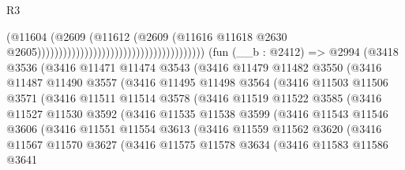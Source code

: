 \begin{lexlean}{R3}
\begin{coremodule}
                                                                        (@11604
                                                                          (@2609
                                                                            (@11612
                                                                              (@2609
                                                                                (@11616
                                                                                  @11618
                                                                                  @2630
                                                                                  @2605)))))))))))))))))))))))))))))))))))))))
    (fun (__b : @2412) =>
    @2994
      (@3418
        @3536
        (@3416
          @11471
          @11474
          @3543
          (@3416
            @11479
            @11482
            @3550
            (@3416
              @11487
              @11490
              @3557
              (@3416
                @11495
                @11498
                @3564
                (@3416
                  @11503
                  @11506
                  @3571
                  (@3416
                    @11511
                    @11514
                    @3578
                    (@3416
                      @11519
                      @11522
                      @3585
                      (@3416
                        @11527
                        @11530
                        @3592
                        (@3416
                          @11535
                          @11538
                          @3599
                          (@3416
                            @11543
                            @11546
                            @3606
                            (@3416
                              @11551
                              @11554
                              @3613
                              (@3416
                                @11559
                                @11562
                                @3620
                                (@3416
                                  @11567
                                  @11570
                                  @3627
                                  (@3416
                                    @11575
                                    @11578
                                    @3634
                                    (@3416
                                      @11583
                                      @11586
                                      @3641

\end{coremodule}
\end{lexlean}
